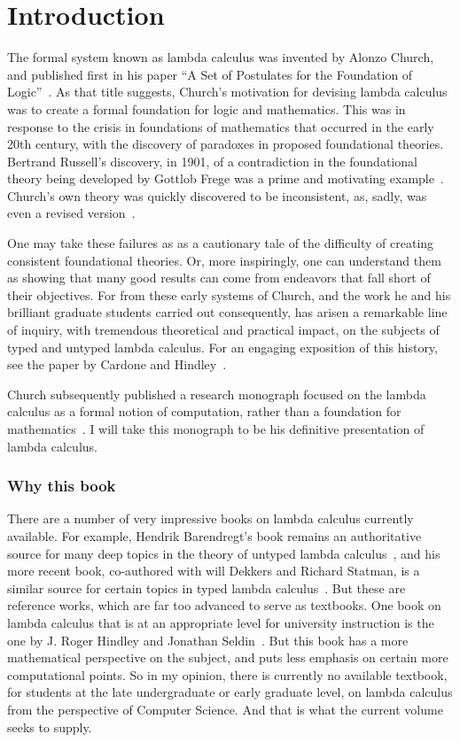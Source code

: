 \chapter{Introduction}

The formal system known as lambda calculus was invented by Alonzo
Church, and published first in his paper ``A Set of Postulates for the
Foundation of Logic''~\cite{church32}.  As that title suggests,
Church's motivation for devising lambda calculus was to create a
formal foundation for logic and mathematics.  This was in response to
the crisis in foundations of mathematics that occurred in the early
20th century, with the discovery of paradoxes in proposed foundational
theories.  Bertrand Russell's discovery, in 1901, of a contradiction
in the foundational theory being developed by Gottlob Frege was a
prime and motivating example~\cite{Whitehead:268025}.  Church's own
theory was quickly discovered to be inconsistent, as, sadly, was even
a revised version~\cite{church33}.  

One may take these failures as as a cautionary tale of the difficulty
of creating consistent foundational theories.  Or, more inspiringly,
one can understand them as showing that many good results can come
from endeavors that fall short of their objectives.  For from these
early systems of Church, and the work he and his brilliant graduate
students carried out consequently, has arisen a remarkable line of
inquiry, with tremendous theoretical and practical impact, on the
subjects of typed and untyped lambda calculus.  For an engaging
exposition of this history, see the paper by Cardone
and Hindley~\cite{cardone09}.

Church subsequently published a research monograph focused on the
lambda calculus as a formal notion of computation, rather than a
foundation for mathematics~\cite{church41}.  I will take this
monograph to be his definitive presentation of lambda calculus.

\subsection{Why this book}

There are a number of very impressive books on lambda calculus
currently available.  For example, Hendrik Barendregt's book remains
an authoritative source for many deep topics in the theory of untyped
lambda calculus~\cite{barendregt85}, and his more recent book,
co-authored with will Dekkers and Richard Statman, is a similar source
for certain topics in typed lambda calculus~\cite{barendregt+13}.  But
these are reference works, which are far too advanced to serve as
textbooks.  One book on lambda calculus that is at an appropriate
level for university instruction is the one by J. Roger Hindley and
Jonathan Seldin~\cite{hindley+08}.  But this book has a more
mathematical perspective on the subject, and puts less emphasis on
certain more computational points.  So in my opinion, there is
currently no available textbook, for students at the late
undergraduate or early graduate level, on lambda calculus from the
perspective of Computer Science.  And that is what the current
volume seeks to supply.
